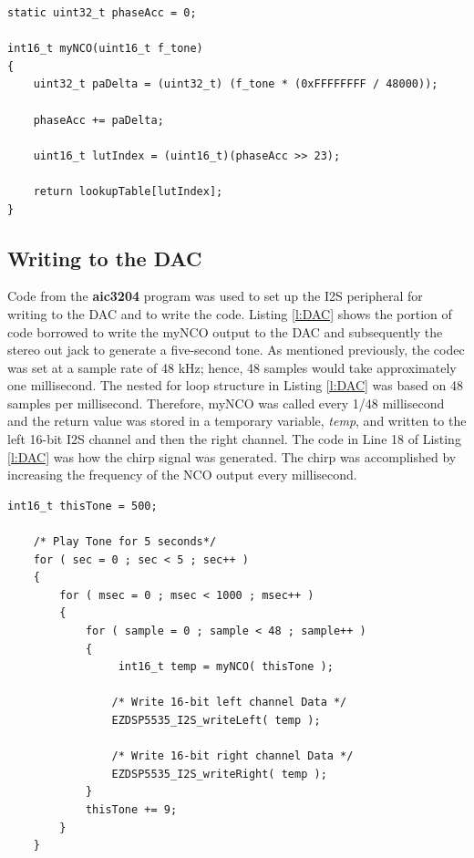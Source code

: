 \documentclass[11pt,pdftex,portrait,letterpaper]{article}
\begin{document}
\begin{lstlisting}[caption={Modular NCO function, myNCO}, label=l:myNCO]
static uint32_t phaseAcc = 0;

int16_t myNCO(uint16_t f_tone)
{
	uint32_t paDelta = (uint32_t) (f_tone * (0xFFFFFFFF / 48000));

	phaseAcc += paDelta;

	uint16_t lutIndex = (uint16_t)(phaseAcc >> 23);

	return lookupTable[lutIndex];
}
\end{lstlisting}

\subsection{Writing to the DAC}

Code from the \textbf{aic3204} program was used to set up the I2S peripheral for writing to the DAC and to write the code. Listing \ref{l:DAC} shows the portion of code borrowed to write the myNCO output to the DAC and subsequently the stereo out jack to generate a five-second tone. As mentioned previously, the codec was set at a sample rate of 48 kHz; hence, 48 samples would take approximately one millisecond. The nested for loop structure in Listing \ref{l:DAC} was based on 48 samples per millisecond. Therefore, myNCO was called every 1/48 millisecond and the return value was stored in a temporary variable, \textit{temp}, and written to the left 16-bit I2S channel and then the right channel. The code in Line 18 of Listing \ref{l:DAC} was how the chirp signal was generated. The chirp was accomplished by increasing the frequency of the NCO output every millisecond.

\begin{lstlisting}[caption={Snippet of code borrowed from aic3204 to write to DAC}, label=l:DAC]
    int16_t thisTone = 500;
  
    /* Play Tone for 5 seconds*/
    for ( sec = 0 ; sec < 5 ; sec++ )
    {
        for ( msec = 0 ; msec < 1000 ; msec++ )
        {
            for ( sample = 0 ; sample < 48 ; sample++ )
            {
                 int16_t temp = myNCO( thisTone );

                /* Write 16-bit left channel Data */
                EZDSP5535_I2S_writeLeft( temp );
                
                /* Write 16-bit right channel Data */
                EZDSP5535_I2S_writeRight( temp );
            }
            thisTone += 9;
        }
    }
\end{lstlisting}
\end{document}
